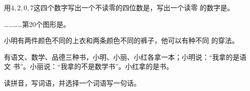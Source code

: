 \documentclass[a4paper, zihao = -4, unicodeGBMath, fontset=sourcesans, %
]{ctexart}
\begin{document}

\begin{qus}
\item 用$4,2,0,7$这四个数字写出一个不读零的四位数是，写出一个读零
  的数字是。
  
\item {}…………第20个图形是。

  \item 小明有两件颜色不同的上衣和两条颜色不同的裤子，他可以有种不同
    的穿法。

\item 有语文、数学、品德三种书，小明、小丽、小红各拿一本；小明说：“我拿的是语文
  书”。小丽说：“我拿的不是数学书”。小红拿的是书。

\item 读拼音，写词语，并选择一个词语写一句话。 %


\end{qus}
\end{document}
